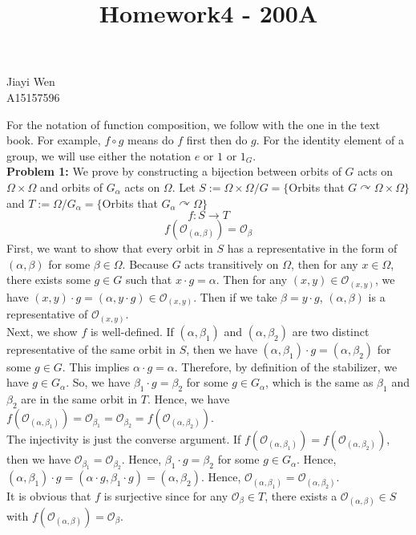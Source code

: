 \documentclass[12pt]{amsart}
\newcommand{\Orbit}{\mathcal{O}}
\begin{document}
\title{Homework4 - 200A}
\maketitle
\begin{center}
    Jiayi Wen\\
    A15157596
\end{center}
\indent For the notation of function composition, we follow with the one in the text book. For example, $f \circ g$ means do $f$ first then do $g$. For the identity element of a group, we will use either the notation $e$ or $1$ or $1_G$.\\
\textbf{Problem 1:} We prove by constructing a bijection between orbits of $G$ acts on $\Omega\times \Omega$ and orbits of $G_\alpha$ acts on $\Omega$. Let $S:=\Omega\times \Omega/G=\{$Orbits that $G\curvearrowright \Omega\times \Omega \}$ and $T:=\Omega/G_\alpha=\{$Orbits that $G_\alpha \curvearrowright \Omega\}$
\[f:S\to T\]
\[f(\mathcal{O}_{(\alpha,\beta)})=\mathcal{O}_\beta\]
First, we want to show that every orbit in $S$ has a representative in the form of $(\alpha,\beta)$ for some $\beta\in \Omega$. Because $G$ acts transitively on $\Omega$, then for any $x\in \Omega$, there exists some $g\in G$ such that $x\cdot g=\alpha$. Then for any $(x,y)\in \Orbit_{(x,y)}$, we have $(x,y)\cdot g=(\alpha,y\cdot g)\in \Orbit_{(x,y)}$. Then if we take $\beta=y\cdot g$, $(\alpha,\beta)$ is a representative of $\Orbit_{(x,y)}$.\\
Next, we show $f$ is well-defined. If $(\alpha, \beta_1)$ and $(\alpha,\beta_2)$ are two distinct representative of the same orbit in $S$, then we have $(\alpha,\beta_1)\cdot g=(\alpha,\beta_2)$ for some $g\in G$. This implies $\alpha\cdot g=\alpha$. Therefore, by definition of the stabilizer, we have $g\in G_\alpha$. So, we have $\beta_1\cdot g=\beta_2$ for some $g\in G_\alpha$, which is the same as $\beta_1$ and $\beta_2$ are in the same orbit in $T$. Hence, we have $f(\Orbit_{(\alpha,\beta_1)})=\Orbit_{\beta_1}=\Orbit_{\beta_2}=f(\Orbit_{(\alpha,\beta_2)})$.\\
The injectivity is just the converse argument. If $f(\Orbit_{(\alpha,\beta_1)})=f(\Orbit_{(\alpha,\beta_2)})$, then we have $\Orbit_{\beta_1}=\Orbit_{\beta_2}$. Hence, $\beta_1\cdot g=\beta_2$ for some $g\in G_\alpha$. Hence, $(\alpha,\beta_1)\cdot g=(\alpha\cdot g,\beta_1\cdot g)=(\alpha,\beta_2)$. Hence, $\Orbit_{(\alpha,\beta_1)}=\Orbit_{(\alpha,\beta_2)}$.\\
It is obvious that $f$ is surjective since for any $\Orbit_\beta\in T$, there exists a $\Orbit_{(\alpha,\beta)}\in S$ with $f(\Orbit_{(\alpha,\beta)})=\Orbit_{\beta}$.
\end{document}
